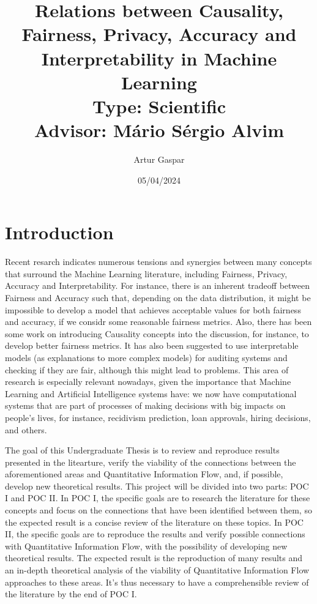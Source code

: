 \documentclass{article}
\title{Relations between Causality, Fairness, Privacy, Accuracy and Interpretability in Machine Learning\large\\ Type: Scientific\\Advisor: Mário Sérgio Alvim}
\author{Artur Gaspar}
\date{05/04/2024}
\begin{document}
\maketitle

\section{Introduction}

Recent resarch\cite{Sok}\cite{Reductions}\cite{Rachel}\cite{Awareness} indicates numerous tensions and synergies between many concepts that surround the Machine Learning literature, including Fairness, Privacy, Accuracy and Interpretability. For instance, there is an inherent tradeoff between Fairness and Accuracy such that, depending on the data distribution, it might be impossible to develop a model that achieves acceptable values for both fairness and accuracy, if we considr some reasonable fairness metrics\cite{Carlos}. Also, there has been some work on introducing Causality concepts into the discussion, for instance, to develop better fairness metrics\cite{CausalFair}. It has also been suggested to use interpretable models (as explanations to more complex models) for auditing systems and checking if they are fair, although this might lead to problems\cite{ExplainAll}. This area of research is especially relevant nowadays, given the importance that Machine Learning and Artificial Intelligence systems have: we now have computational systems that are part of processes of making decisions with big impacts on people's lives, for instance, recidivism prediction\cite{Compass}, loan approvals\cite{Loans}, hiring decisions\cite{Jobs}, and others.

The goal of this Undergraduate Thesis is to review and reproduce results presented in the litearture, verify the viability of the connections between the aforementioned areas and Quantitative Information Flow, and, if possible, develop new theoretical results. This project will be divided into two parts: POC I and POC II. In POC I, the specific goals are to research the literature for these concepts and focus on the connections that have been identified between them, so the expected result is a concise review of the literature on these topics. In POC II, the specific goals are to reproduce the results and verify possible connections with Quantitative Information Flow, with the possibility of developing new theoretical results. The expected result is the reproduction of many results and an in-depth theoretical analysis of the viability of Quantitative Information Flow approaches to these areas. It's thus necessary to have a comprehensible review of the literature by the end of POC I.
\end{document}
